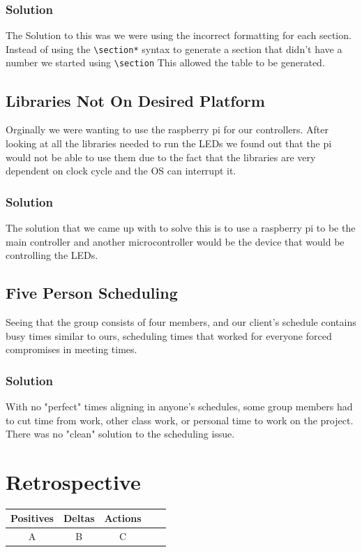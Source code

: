 \documentclass[onecolumn, draftclsnofoot,10pt, compsoc]{IEEEtran}
\begin{document}
				\subsubsection{Solution}
				The Solution to this was we were using the incorrect formatting for each
				section. Instead of using the \verb|\section*| syntax to generate a section that
				didn't have a number we started using \verb|\section| This allowed the table
				to be generated.
			\subsection{Libraries Not On Desired Platform}
      Orginally we were wanting to use the raspberry pi for our controllers. After
      looking at all the libraries needed to run the LEDs we found out that the
      pi would not be able to use them due to the fact that the libraries are very
      dependent on clock cycle and the OS can interrupt it.
		  	\subsubsection{Solution}
		    The solution that we came up with to solve this is to use a raspberry pi to
		    be the main controller and another microcontroller would be the device that
		    would be controlling the LEDs.
		 \subsection{Five Person Scheduling}
		 Seeing that the group consists of four members, and our client's schedule contains busy times similar to ours, scheduling times that worked for everyone
		 forced compromises in meeting times.
		 	  \subsubsection{Solution}
			  With no "perfect" times aligning in anyone's schedules, some group members had to cut time from work, other class work, or personal time to work on the project.
			  There was no "clean" solution to the scheduling issue.


	\section{Retrospective}
	\begin{tabular}{ |c|c|c|c|c| }
		\hline
		Positives & Deltas & Actions \\
		\hline
		A & B & C \\
		\hline
	\end{tabular}
\end{document}
